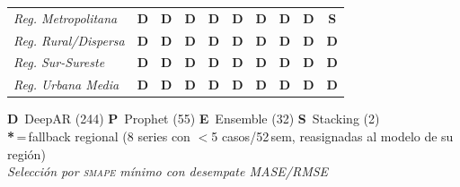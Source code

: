 \documentclass[12pt, letterpaper]{article}
\newcommand{\smape}{\textnormal{\textsc{smape}}}
\begin{document}
\begin{table}[H]
\begin{tabular}{l|CCC|CCC|CCC}
\midrule
\textit{Reg. Metropolitana} & \textcolor{cdeepar}{\textbf{D}} & \textcolor{cdeepar}{\textbf{D}} & \textcolor{cdeepar}{\textbf{D}} & \textcolor{cdeepar}{\textbf{D}} & \textcolor{cdeepar}{\textbf{D}} & \textcolor{cdeepar}{\textbf{D}} & \textcolor{cdeepar}{\textbf{D}} & \textcolor{cdeepar}{\textbf{D}} & \textcolor{cstacking}{\textbf{S}} \\
\textit{Reg. Rural/Dispersa} & \textcolor{cdeepar}{\textbf{D}} & \textcolor{cdeepar}{\textbf{D}} & \textcolor{cdeepar}{\textbf{D}} & \textcolor{cdeepar}{\textbf{D}} & \textcolor{cdeepar}{\textbf{D}} & \textcolor{cdeepar}{\textbf{D}} & \textcolor{cdeepar}{\textbf{D}} & \textcolor{cdeepar}{\textbf{D}} & \textcolor{cdeepar}{\textbf{D}} \\
\textit{Reg. Sur-Sureste} & \textcolor{cdeepar}{\textbf{D}} & \textcolor{cdeepar}{\textbf{D}} & \textcolor{cdeepar}{\textbf{D}} & \textcolor{cdeepar}{\textbf{D}} & \textcolor{cdeepar}{\textbf{D}} & \textcolor{cdeepar}{\textbf{D}} & \textcolor{cdeepar}{\textbf{D}} & \textcolor{cdeepar}{\textbf{D}} & \textcolor{cdeepar}{\textbf{D}} \\
\textit{Reg. Urbana Media} & \textcolor{cdeepar}{\textbf{D}} & \textcolor{cdeepar}{\textbf{D}} & \textcolor{cdeepar}{\textbf{D}} & \textcolor{cdeepar}{\textbf{D}} & \textcolor{cdeepar}{\textbf{D}} & \textcolor{cdeepar}{\textbf{D}} & \textcolor{cdeepar}{\textbf{D}} & \textcolor{cdeepar}{\textbf{D}} & \textcolor{cdeepar}{\textbf{D}} \\
\bottomrule
\end{tabular}

\vspace{0.3cm}
\footnotesize
\colorbox{cdeepar!12}{\textcolor{cdeepar}{\textbf{D}}}~DeepAR (244) \quad
\colorbox{cprophet!12}{\textcolor{cprophet}{\textbf{P}}}~Prophet (55) \quad
\colorbox{censemble!12}{\textcolor{censemble}{\textbf{E}}}~Ensemble (32) \quad
\colorbox{cstacking!12}{\textcolor{cstacking}{\textbf{S}}}~Stacking (2)\\[2pt]
\textbf{*}\,=\,fallback regional (8 series con $<$5 casos/52\,sem, reasignadas al modelo de su región)\\[2pt]
\textit{Selección por \smape{} mínimo con desempate MASE/RMSE}

\end{table}
\end{document}
